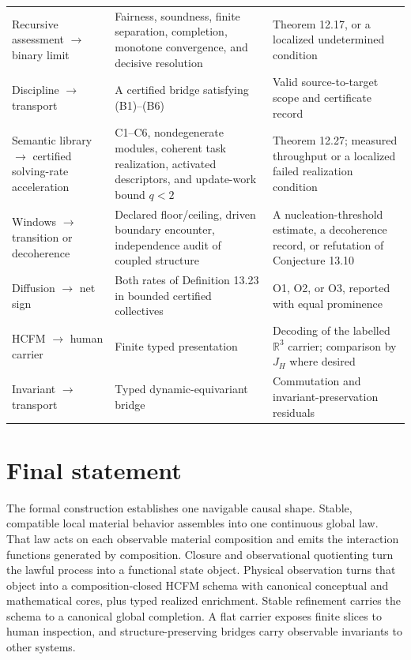 \documentclass[11pt]{article}
\theoremstyle{definition}
\begin{document}
\begin{center}
\begin{longtable}{@{}p{}p{}p{}@{}}
Recursive assessment $\to$ binary limit & Fairness, soundness, finite separation, completion, monotone convergence, and decisive resolution & Theorem 12.17, or a localized undetermined condition\\
Discipline $\to$ transport & A certified bridge satisfying (B1)--(B6) & Valid source-to-target scope and certificate record\\
Semantic library $\to$ certified solving-rate acceleration & C1--C6, nondegenerate modules, coherent task realization, activated descriptors, and update-work bound $q < 2$ & Theorem 12.27; measured throughput or a localized failed realization condition\\
Windows $\to$ transition or decoherence & Declared floor/ceiling, driven boundary encounter, independence audit of coupled structure & A nucleation-threshold estimate, a decoherence record, or refutation of Conjecture 13.10\\
Diffusion $\to$ net sign & Both rates of Definition 13.23 in bounded certified collectives & O1, O2, or O3, reported with equal prominence\\
HCFM $\to$ human carrier & Finite typed presentation & Decoding of the labelled $\mathbb{R}^3$ carrier; comparison by $J_H$ where desired\\
Invariant $\to$ transport & Typed dynamic-equivariant bridge & Commutation and invariant-preservation residuals\\
\bottomrule
\end{longtable}
\end{center}

\section{Final statement}

The formal construction establishes one navigable causal shape. Stable, compatible local material behavior assembles into one continuous global law. That law acts on each observable material composition and emits the interaction functions generated by composition. Closure and observational quotienting turn the lawful process into a functional state object. Physical observation turns that object into a composition-closed HCFM schema with canonical conceptual and mathematical cores, plus typed realized enrichment. Stable refinement carries the schema to a canonical global completion. A flat carrier exposes finite slices to human inspection, and structure-preserving bridges carry observable invariants to other systems.
\end{document}
